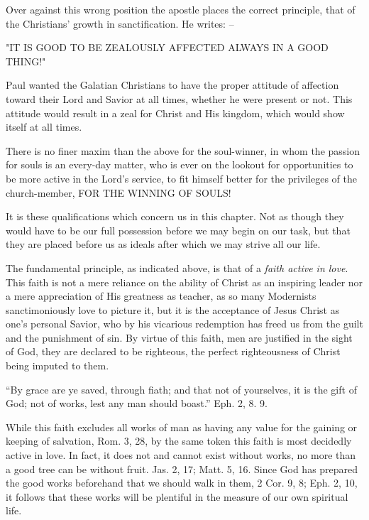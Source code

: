 \documentclass[
]{book}
\begin{document}
Over against this wrong position the apostle places the correct principle, that of the Christians' growth in sanctification. He writes: --

\begin{center} "IT IS GOOD TO BE ZEALOUSLY AFFECTED ALWAYS IN A GOOD THING!" \end{center}

Paul wanted the Galatian Christians to have the proper attitude of affection toward their Lord and Savior at all times, whether he were present or not. This attitude would result in a zeal for Christ and His kingdom, which would show itself at all times.

There is no finer maxim than the above for the soul-winner, in whom the passion for souls is an every-day matter, who is ever on the lookout for opportunities to be more active in the Lord's service, to fit himself better for the privileges of the church-member, FOR THE WINNING OF SOULS!

It is these qualifications which concern us in this chapter. Not as though they would have to be our full possession before we may begin on our task, but that they are placed before us as ideals after which we may strive all our life.

The fundamental principle, as indicated above, is that of a \emph{faith active in love}. This faith is not a mere reliance on the ability of Christ as an inspiring leader nor a mere appreciation of His greatness as teacher, as so many Modernists sanctimoniously love to picture it, but it is the acceptance of Jesus Christ as one's personal Savior, who by his vicarious redemption has freed us from the guilt and the punishment of sin. By virtue of this faith, men are justified in the sight of God, they are declared to be righteous, the perfect righteousness of Christ being imputed to them.

``By grace are ye saved, through fiath; and that not of yourselves, it is the gift of God; not of works, lest any man should boast.'' Eph. 2, 8. 9.

While this faith excludes all works of man as having any value for the gaining or keeping of salvation, Rom. 3, 28, by the same token this faith is most decidedly active in love. In fact, it does not and cannot exist without works, no more than a good tree can be without fruit. Jas. 2, 17; Matt. 5, 16. Since God has prepared the good works beforehand that we should walk in them, 2 Cor. 9, 8; Eph. 2, 10, it follows that these works will be plentiful in the measure of our own spiritual life.
\end{document}
